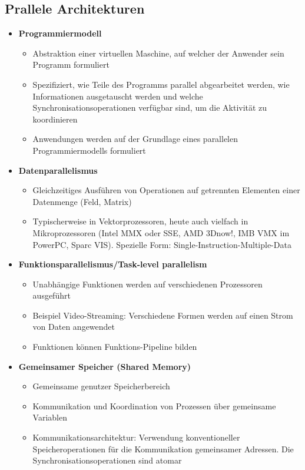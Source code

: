 \subsection{Prallele Architekturen}
\begin{itemize}
	\item \textbf{Programmiermodell}
	\begin{itemize}
		\item Abstraktion einer virtuellen Maschine, auf welcher der Anwender sein Programm formuliert
		\item Spezifiziert, wie Teile des Programms parallel abgearbeitet werden, wie Informationen ausgetauscht werden und welche Synchronisationsoperationen verfügbar sind, um die Aktivität zu koordinieren
		\item Anwendungen werden auf der Grundlage eines parallelen Programmiermodells formuliert
	\end{itemize}
	\item \textbf{Datenparallelismus}
	\begin{itemize}
		\item Gleichzeitiges Ausführen von Operationen auf getrennten Elementen einer Datenmenge (Feld, Matrix)
		\item Typischerweise in Vektorprozessoren, heute auch vielfach in Mikroprozessoren (Intel MMX oder SSE, AMD 3Dnow!, IMB VMX im PowerPC, Sparc VIS). Spezielle Form: Single-Instruction-Multiple-Data
	\end{itemize}
	\item \textbf{Funktionsparallelismus/Task-level parallelism}
	\begin{itemize}
		\item Unabhängige Funktionen werden auf verschiedenen Prozessoren ausgeführt
		\item Beispiel Video-Streaming: Verschiedene Formen werden auf einen Strom von Daten angewendet
		\item Funktionen können Funktions-Pipeline bilden
	\end{itemize}
	\item \textbf{Gemeinsamer Speicher (Shared Memory)}
	\begin{itemize}
		\item Gemeinsame genutzer Speicherbereich
		\item Kommunikation und Koordination von Prozessen über gemeinsame Variablen
		\item Kommunikationsarchitektur: Verwendung konventioneller Speicheroperationen für die Kommunikation gemeinsamer Adressen. Die Synchronisationsoperationen sind atomar

\end{itemize}
\end{itemize}
